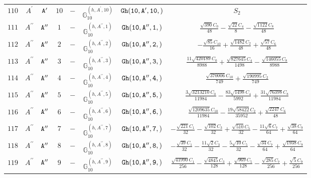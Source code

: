 \documentclass[fleqn,8pt]{jsarticle}
\begin{document}
\begin{table}[ht!]
\begin{center}
\begin{tabular}{cccccccc}
$ 110 $ & $ A^{\prime} $ & $ {\tt A'} $ & $ 10 $ & $ - $ & $ \mathbb{G}_{10}^{(h,A^{\prime},10)} $ & $ {\tt Gh(10,A',10,)} $ & $ S_{2} $ \\
$ 111 $ & $ A^{\prime\prime} $ & $ {\tt A''} $ & $ 1 $ & $ - $ & $ \mathbb{G}_{10}^{(h,A^{\prime\prime},1)} $ & $ {\tt Gh(10,A'',1,)} $ & $ \frac{\sqrt{390} C_{0}}{48} - \frac{\sqrt{22} C_{4}}{8} - \frac{\sqrt{1122} C_{8}}{48} $ \\
$ 112 $ & $ A^{\prime\prime} $ & $ {\tt A''} $ & $ 2 $ & $ - $ & $ \mathbb{G}_{10}^{(h,A^{\prime\prime},2)} $ & $ {\tt Gh(10,A'',2,)} $ & $ - \frac{\sqrt{85} C_{10}}{16} + \frac{\sqrt{1482} C_{2}}{48} + \frac{\sqrt{57} C_{6}}{48} $ \\
$ 113 $ & $ A^{\prime\prime} $ & $ {\tt A''} $ & $ 3 $ & $ - $ & $ \mathbb{G}_{10}^{(h,A^{\prime\prime},3)} $ & $ {\tt Gh(10,A'',3,)} $ & $ \frac{11 \sqrt{420189} C_{0}}{8988} + \frac{\sqrt{827645} C_{4}}{1498} - \frac{\sqrt{146055} C_{8}}{8988} $ \\
$ 114 $ & $ A^{\prime\prime} $ & $ {\tt A''} $ & $ 4 $ & $ - $ & $ \mathbb{G}_{10}^{(h,A^{\prime\prime},4)} $ & $ {\tt Gh(10,A'',4,)} $ & $ \frac{\sqrt{370006} C_{10}}{749} + \frac{\sqrt{190995} C_{2}}{749} $ \\
$ 115 $ & $ A^{\prime\prime} $ & $ {\tt A''} $ & $ 5 $ & $ - $ & $ \mathbb{G}_{10}^{(h,A^{\prime\prime},5)} $ & $ {\tt Gh(10,A'',5,)} $ & $ \frac{3 \sqrt{3213210} C_{0}}{11984} - \frac{83 \sqrt{1498} C_{4}}{5992} + \frac{31 \sqrt{76398} C_{8}}{11984} $ \\
$ 116 $ & $ A^{\prime\prime} $ & $ {\tt A''} $ & $ 6 $ & $ - $ & $ \mathbb{G}_{10}^{(h,A^{\prime\prime},6)} $ & $ {\tt Gh(10,A'',6,)} $ & $ \frac{\sqrt{1209635} C_{10}}{11984} - \frac{19 \sqrt{58422} C_{2}}{35952} + \frac{\sqrt{2247} C_{6}}{48} $ \\
$ 117 $ & $ A^{\prime\prime} $ & $ {\tt A''} $ & $ 7 $ & $ - $ & $ \mathbb{G}_{10}^{(h,A^{\prime\prime},7)} $ & $ {\tt Gh(10,A'',7,)} $ & $ - \frac{\sqrt{221} C_{1}}{32} - \frac{\sqrt{102} C_{3}}{32} + \frac{\sqrt{510} C_{5}}{32} - \frac{11 \sqrt{6} C_{7}}{64} + \frac{\sqrt{38} C_{9}}{64} $ \\
$ 118 $ & $ A^{\prime\prime} $ & $ {\tt A''} $ & $ 8 $ & $ - $ & $ \mathbb{G}_{10}^{(h,A^{\prime\prime},8)} $ & $ {\tt Gh(10,A'',8,)} $ & $ - \frac{\sqrt{39} C_{1}}{32} - \frac{11 \sqrt{2} C_{3}}{32} - \frac{5 \sqrt{10} C_{5}}{32} - \frac{\sqrt{34} C_{7}}{64} + \frac{\sqrt{1938} C_{9}}{64} $ \\
$ 119 $ & $ A^{\prime\prime} $ & $ {\tt A''} $ & $ 9 $ & $ - $ & $ \mathbb{G}_{10}^{(h,A^{\prime\prime},9)} $ & $ {\tt Gh(10,A'',9,)} $ & $ \frac{\sqrt{41990} C_{1}}{256} - \frac{\sqrt{4845} C_{3}}{128} + \frac{\sqrt{969} C_{5}}{128} - \frac{\sqrt{285} C_{7}}{256} + \frac{\sqrt{5} C_{9}}{256} $ \\

\end{tabular}
\end{center}
\end{table}
\end{document}

